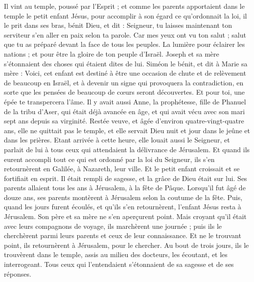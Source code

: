 \begin{multicols}{2}
Il vint au temple, poussé par l'Esprit ; et comme les parents apportaient dans le temple le petit enfant Jésus, pour accomplir à son égard ce qu’ordonnait la loi,
il le prit dans ses bras, bénit Dieu, et dit :
Seigneur, tu laisses maintenant ton serviteur s’en aller en paix selon ta parole.
Car mes yeux ont vu ton salut ;
salut que tu as préparé devant la face de tous les peuples.
La lumière pour éclairer les nations ; et pour être la gloire de ton peuple d'Israël.
Joseph et sa mère s'étonnaient des choses qui étaient dites de lui.
Siméon le bénit, et dit à Marie sa mère : Voici, cet enfant est destiné à être une occasion de chute et de relèvement de beaucoup en Israël, et à devenir un signe qui provoquera la contradiction,
en sorte que les pensées de beaucoup de cœurs seront découvertes. Et pour toi, une épée te transpercera l’âme.
Il y avait aussi Anne, la prophétesse, fille de Phanuel de la tribu d'Aser, qui était déjà avancée en âge, et qui avait vécu avec son mari sept ans depuis sa virginité.
Restée veuve, et âgée d’environ quatre-vingt-quatre ans, elle ne quittait pas le temple, et elle servait Dieu nuit et jour dans le jeûne et dans les prières.
Etant arrivée à cette heure, elle louait aussi le Seigneur, et parlait de lui à tous ceux qui attendaient la délivrance de Jérusalem.
Et quand ils eurent accompli tout ce qui est ordonné par la loi du Seigneur, ils s'en retournèrent en Galilée, à Nazareth, leur ville.
Et le petit enfant croissait et se fortifiait en esprit. Il était rempli de sagesse, et la grâce de Dieu était sur lui.
Ses parents allaient tous les ans à Jérusalem, à la fête de Pâque.
Lorsqu’il fut âgé de douze ans, ses parents montèrent à Jérusalem selon la coutume de la fête.
Puis, quand les jours furent écoulés, et qu’ils s’en retournèrent, l’enfant Jésus resta à Jérusalem. Son père et sa mère ne s'en aperçurent point.
Mais croyant qu'il était avec leurs compagnons de voyage, ils marchèrent une journée ; puis ils le cherchèrent parmi leurs parents et ceux de leur connaissance.
Et ne le trouvant point, ils retournèrent à Jérusalem, pour le chercher.
Au bout de trois jours, ils le trouvèrent dans le temple, assis au milieu des docteurs, les écoutant, et les interrogeant.
Tous ceux qui l'entendaient s'étonnaient de sa sagesse et de ses réponses.

\end{multicols}
